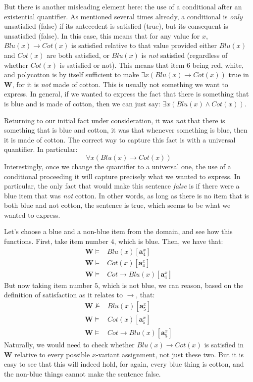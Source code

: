 But there is another misleading element here: the use of a conditional after an existential quantifier. As mentioned several times already, a conditional is \textit{only} unsatisfied (false) if its antecedent is satisfied (true), but its consequent is unsatisfied (false). In this case, this means that for any value for $x$, $Blu(x) \rightarrow Cot(x)$ is satisfied relative to that value provided either $Blu(x)$ and $Cot(x)$ are both satisfied, or $Blu(x)$ is \textit{not} satisfied (regardless of whether $Cot(x)$ is satisfied or not). This means that item $6$ being red, white, and polycotton is by itself sufficient to make $\exists x (Blu(x) \rightarrow Cot(x))$ true in $\mathbf{W}$, for it is \textit{not} made of cotton. This is usually not something we want to express. In general, if we wanted to express the fact that there is something that is blue and is made of cotton, then we can just say: $\exists x(Blu(x) \wedge Cot(x))$. 

Returning to our initial fact under consideration, it was \textit{not} that there is something that is blue and cotton, it was that whenever something is blue, then it is made of cotton. The correct way to capture this fact is with a universal quantifier. In particular:
\[
\forall x(Blu(x) \rightarrow Cot(x))
\]
Interestingly, once we change the quantifier to a universal one, the use of a conditional proceeding it will capture precisely what we wanted to express. In particular, the only fact that would make this sentence \textit{false} is if there were a blue item that was \textit{not} cotton. In other words, as long as there is no item that is both blue and not cotton, the sentence is true, which seems to be what we wanted to express. 

Let's choose a blue and a non-blue item from the domain, and see how this functions. First, take item number $4$, which is blue. Then, we have that:
\begin{align*}
	\mathbf{W} \models& Blu(x)[\mathbf{a}^x_4]\\
	\mathbf{W} \models& Cot(x)[\mathbf{a}^x_4]\\
	\mathbf{W} \models& Cot \rightarrow Blu(x)[\mathbf{a}^x_4]
\end{align*}
But now taking item number $5$, which is not blue, we can reason, based on the definition of satisfaction as it relates to $\rightarrow$, that:
\begin{align*}
	\mathbf{W} \not\models& Blu(x)[\mathbf{a}^x_5]\\
	\mathbf{W} \models& Cot(x)[\mathbf{a}^x_5]\\
	\mathbf{W} \models& Cot \rightarrow Blu(x)[\mathbf{a}^x_5]
\end{align*}
Naturally, we would need to check whether $Blu(x) \rightarrow Cot(x)$ is satisfied in $\mathbf{W}$ relative to every possible $x$-variant assignment, not just these two. But it is easy to see that this will indeed hold, for again, every blue thing is cotton, and the non-blue things cannot make the sentence false. 

